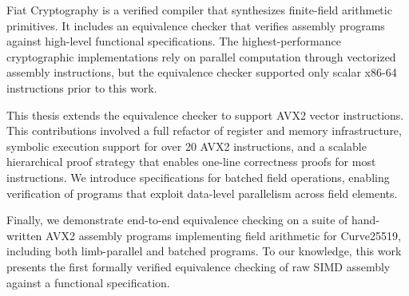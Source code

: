 %
%

Fiat Cryptography is a verified compiler that synthesizes finite-field arithmetic primitives. 
It includes an equivalence checker that verifies assembly programs against high-level functional specifications.
The highest-performance cryptographic implementations rely on parallel computation through vectorized assembly instructions, but the equivalence checker supported only scalar x86-64 instructions prior to this work.

This thesis extends the equivalence checker to support AVX2 vector instructions. This contributions involved a full refactor of register and memory infrastructure, symbolic execution support for over 20 AVX2 instructions, and a scalable hierarchical proof strategy that enables one-line correctness proofs for most instructions. We introduce specifications for batched field operations, enabling verification of programs that exploit data-level parallelism across field elements.

Finally, we demonstrate end-to-end equivalence checking on a suite of hand-written AVX2 assembly programs implementing field arithmetic for Curve25519, including both limb-parallel and batched programs. To our knowledge, this work presents the first formally verified equivalence checking of raw SIMD assembly against a functional specification.
